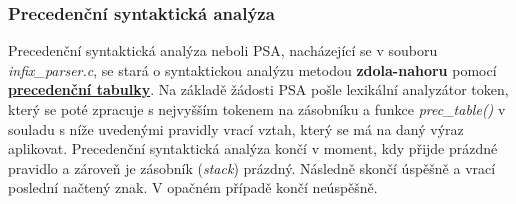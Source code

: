 \documentclass[a4paper, 12pt]{article} %
\begin{document}
            \subsubsection{Precedenční syntaktická analýza}
                Precedenční syntaktická analýza neboli PSA, nacházející se v souboru \textit{infix\_parser.c},
                se stará o syntaktickou analýzu metodou
                \textbf{zdola-nahoru} pomocí \hyperref[prectabulka]{\textbf{precedenční tabulky}}. Na základě
                žádosti PSA pošle lexikální analyzátor token, který se poté zpracuje s nejvyšším tokenem
                na zásobníku a funkce \textit{prec\_table()} v souladu s níže uvedenými pravidly vrací vztah,
                který se má na daný výraz aplikovat. Precedenční syntaktická analýza končí v moment, kdy
                přijde prázdné pravidlo a zároveň je zásobník (\textit{stack}) prázdný. Následně skončí
                úspěšně a vrací poslední načtený znak. V opačném případě končí neúspěšně.
\end{document}
